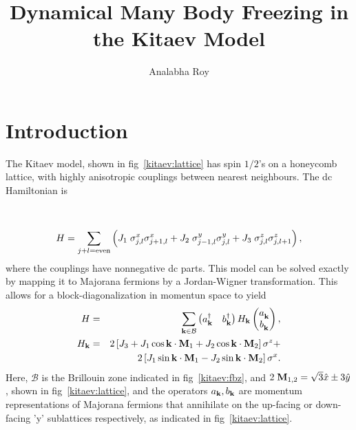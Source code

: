 \documentclass[a4paper,10pt]{article}
\title{Dynamical Many Body Freezing in the Kitaev Model}
\author{Analabha Roy}
\begin{document}
\maketitle
\section{\sc Introduction}
The Kitaev model, shown in fig~\ref{kitaev:lattice} has spin $1/2$'s on a honeycomb lattice, with highly anisotropic couplings between nearest neighbours. The dc Hamiltonian is
\begin{figure*}[hbt]
\ 
\caption{Kitaev model on a Honeycomb lattice}  
\label{kitaev:lattice}
\end{figure*}
\begin{equation}
\label{hamilt}
H = \sum_{j+l = {\rm even}} \left(J_1\; \sigma^x_{j,l}\sigma^x_{j+1,l}+J_2\;\sigma^y_{j-1,l}\sigma^y_{j,l}+J_3\; \sigma^z_{j,l}\sigma^z_{j,l+1}\right),
\end{equation}
where the couplings have nonnegative dc parts. This model can be solved exactly by mapping it to Majorana fermions by a Jordan-Wigner transformation. This allows for a block-diagonalization in momentun space to yield
\begin{eqnarray}
\label{hamilt:p}
H &=& \sum_{{\bf k}\in\mathcal{B}} 
\begin{pmatrix}
a^\dagger_{{\bf k}} & b^\dagger_{{\bf k}}
\end{pmatrix}
H_{{\bf k}}
\begin{pmatrix}
a^{\;}_{{\bf k}} \\
b^{\;}_{{\bf k}}
\end{pmatrix},\nonumber \\
H_{{\bf k}} &=& 2\left[J_3 + J_1 \cos{{\bf k}\cdot{\bf M}_1} + J_2 \cos{{\bf k}\cdot{\bf M}_2}\right]\sigma^z +\nonumber \\
	    & & 2\left[J_1 \sin{{\bf k}\cdot{\bf M}_1} - J_2 \sin{{\bf k}\cdot{\bf M}_2}\right]\sigma^x.
\end{eqnarray}
Here, $\mathcal{B}$ is the Brillouin zone indicated in fig~\ref{kitaev:fbz}, and $2\;{\bf M}_{1,2} = \sqrt{3} \hat{x}\pm 3\hat{y}$, shown in fig~\ref{kitaev:lattice}, and the operators $a_{\bf k}, b_{\bf k}$ are momentum representations of Majorana fermions that annihilate on the up-facing or down-facing 'y' sublattices respectively, as indicated in fig~\ref{kitaev:lattice}.
\end{document}
